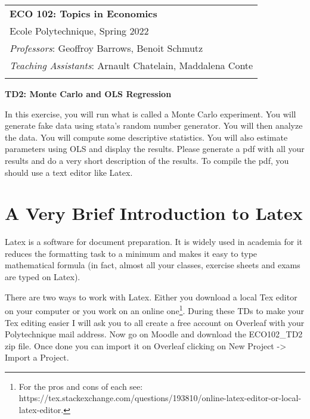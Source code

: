 \documentclass[11pt, a4paper]{article} %
\begin{document}
\begin{tabular}{p{14.5cm}}
	{\large \textbf{ECO 102: Topics in Economics}} \\
	Ecole Polytechnique, Spring 2022  \\
	\textit{Professors}: Geoffroy Barrows, Benoit Schmutz \\
	\textit{Teaching Assistants}: Arnault Chatelain, Maddalena Conte \\
	\hline
	\\
\end{tabular}

\begin{center}
	{\Large \textbf{TD2: Monte Carlo and OLS Regression}}
	\vspace{2mm}
	
\end{center} 

\vspace{0.4cm}

In this exercise, you will run what is called a Monte Carlo experiment.  You will generate fake data using stata's random number generator.  You will then analyze the data.  You will compute some descriptive statistics.  You will also estimate parameters using OLS and display the results.  Please generate a pdf with all your results and do a very short description of the results.  To compile the pdf, you should use a text editor like Latex.

\section*{A Very Brief Introduction to Latex}

Latex is a software for document preparation. It is widely used in academia for it reduces the formatting task to a minimum and makes it easy to type mathematical formula (in fact, almost all your classes, exercise sheets and exams are typed on Latex).

There are two ways to work with Latex. Either you download a local Tex editor on your computer or you work on an online one\footnote{For the pros and cons of each see: https://tex.stackexchange.com/questions/193810/online-latex-editor-or-local-latex-editor.}. During these TDs to make your Tex editing easier I will ask you to all create a free account on Overleaf with your Polytechnique mail address. Now go on Moodle and download the ECO102\_TD2 zip file. Once done you can import it on Overleaf clicking on New Project -> Import a Project. 
\end{document}
